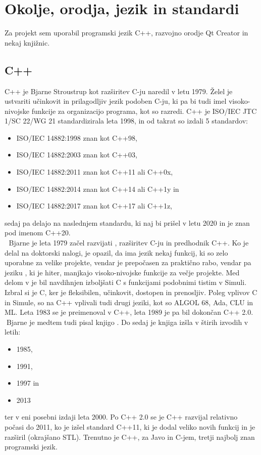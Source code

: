 \documentclass[12pt,titlepage]{report}
\newcommand{\wdot}{\textcolor{white}{.}}
\newcommand{\odstavek}{\wdot \\ \wdot \qquad}
\begin{document}
	\section{Okolje, orodja, jezik in standardi}
		Za projekt sem uporabil programski jezik C++, razvojno orodje Qt Creator in nekaj knjižnic.
		\subsection{C++}			
			C++ je Bjarne Stroustrup kot razširitev C-ju naredil v letu 1979.
			Želel je ustvariti učinkovit in prilagodljiv jezik podoben C-ju, ki pa bi tudi imel visoko-nivojske funkcije za organizacijo programa, kot so razredi.
			C++ je ISO/IEC JTC 1/SC 22/WG 21 standardizirala leta 1998, in od takrat so izdali 5 standardov:\cite{cpp_wiki}
			\begin{itemize}
				\item ISO/IEC 14882:1998 znan kot C++98,
				\item ISO/IEC 14882:2003 znan kot C++03,
				\item ISO/IEC 14882:2011 znan kot C++11 ali C++0x,
				\item ISO/IEC 14882:2014 znan kot C++14 ali C++1y in
				\item ISO/IEC 14882:2017 znan kot C++17 ali C++1z,
			\end{itemize}
			sedaj pa delajo na naslednjem standardu, ki naj bi prišel v letu 2020 in je znan pod imenom C++20.
			\odstavek
			Bjarne je leta 1979 začel razvijati , razširitev C-ju in predhodnik C++.
			Ko je delal na doktorski nalogi, je opazil, da ima jezik  nekaj funkcij, ki so zelo uporabne za velike projekte, vendar je prepočasen za praktično rabo, vendar pa jeziku , ki je hiter, manjkajo visoko-nivojske funkcije za večje projekte.
			Med delom v  je bil navdihnjen izboljšati C s funkcijami podobnimi tistim v Simuli.
			Izbral si je C, ker je fleksibilen, učinkovit, dostopen in prenosljiv.
			Poleg vplivov C in Simule, so na C++ vplivali tudi drugi jeziki, kot so ALGOL 68, Ada, CLU in ML.
			Leta 1983 se je  preimenoval v C++, leta 1989 je pa bil dokončan C++ 2.0.
			\odstavek Bjarne je medtem tudi pisal knjigo .
			Do sedaj je knjiga izšla v štirih izvodih v letih: \cite{the_cpp_programming_language_wiki}
			\begin{itemize}
				\item 1985,
				\item 1991,
				\item 1997 in
				\item 2013
			\end{itemize}
			ter v eni posebni izdaji leta 2000.
			Po C++ 2.0 se je C++ razvijal relativno počasi do 2011, ko je izšel standard C++11, ki je dodal veliko novih funkcij in je razširil  (okrajšano STL).
			Trenutno je C++, za Javo in C-jem, tretji najbolj znan programski jezik.~\cite{tiobe}
\end{document}
